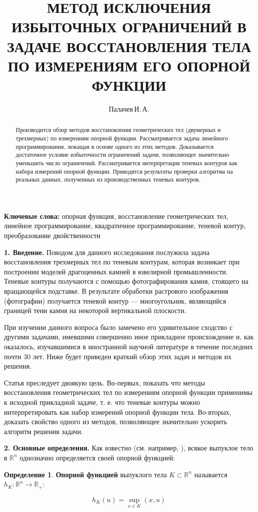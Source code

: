 \documentclass[a4paper, 10pt]{article}
\title{МЕТОД ИСКЛЮЧЕНИЯ ИЗБЫТОЧНЫХ ОГРАНИЧЕНИЙ В ЗАДАЧЕ ВОССТАНОВЛЕНИЯ ТЕЛА ПО 
ИЗМЕРЕНИЯМ ЕГО ОПОРНОЙ ФУНКЦИИ}
\author{Палачев\,И.\,А.}
\theoremstyle{definition}
\newtheorem{SmartDefinition}{Определение}
\theoremstyle{plain}
\theoremstyle{plain}
\begin{document}
\maketitle
\begin{abstract}
 Производится обзор методов восстановления геометрических тел (двумерных и
 трехмерных) по измерениям опорной функции. Рассматривается задача линейного
 программирования, лежащая в основе одного из этих методов. Доказывается
 достаточное условие избыточности ограничений задачи, позволяющее значительно
 уменьшить число ограничений. Рассматривается интерпретация теневых контуров
 как набора измерений опорной функции. Приводятся результаты проверки
 алгоритма на реальных данных, полученных из производственных теневых контуров.
\end{abstract}

\textbf{Ключевые слова:} опорная функция, восстановление геометрических тел,
линейное программирование, квадратичное программирование, теневой контур,
преобразование двойственности

\textbf{1. Введение.} Поводом для данного исследования послужила задача
восстановления трехмерных тел по теневым контурам, которая возникает при
построении моделей драгоценных камней в ювелирной промышленности. Теневые
контуры получаются с помощью фотографирования камня, стоящего на вращающейся
подставке. В результате обработки растрового изображения (фотографии) получается
теневой контур --- многоугольник, являющийся границей тени камня на некоторой
вертикальной плоскости.

При изучении данного вопроса было замечено его удивительное сходство с другими
задачами, имевшими совершенно иное прикладное происхождение и, как оказалось,
изучавшимися в иностранной научной литературе в течение последних почти 30 лет.
Ниже будет приведен краткий обзор этих задач и методов их решения.

Статья преследует двоякую цель. Во-первых, показать что методы
восстановления геометрических тел по измерениям опорной функции применимы к
исходной прикладной задаче, т. е. что теневые контуры можно интерпретировать
как набор измерений опорной функции тела. Во-вторых, доказать свойство
одного из методов, позволяющее значительно ускорить алгоритм решения задачи.

\textbf{2. Основные определения.} Как известно (см. например,
\cite{Ghosh:1998:SFR:307150.307167}), всякое выпуклое тело в $\mathbb{R}^{n}$
однозначно определяется своей опорной функцией:

\begin{SmartDefinition}
 \label{def:support-function}
 \textbf{Опорной функцией} выпуклого тела $K \subset \mathbb{R}^{n}$
 называется
 $h_{K}: \mathbb{R}^{n} \to \mathbb{R}_{+}$:

 \begin{equation}h_{K}(u) = \sup \limits_{x \in K}(x, u)\end{equation}
\end{SmartDefinition}
\end{document}
